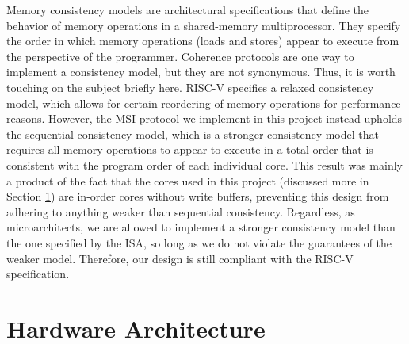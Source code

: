 \documentclass[10pt, compsoc]{IEEEtran}
\begin{document}
Memory consistency models are architectural specifications that define the behavior of memory operations in a shared-memory multiprocessor. They specify the order in which memory operations (loads and stores) appear to execute from the perspective of the programmer. Coherence protocols are one way to implement a consistency model, but they are not synonymous. Thus, it is worth touching on the subject briefly here. RISC-V specifies a relaxed consistency model, which allows for certain reordering of memory operations for performance reasons. However, the MSI protocol we implement in this project instead upholds the sequential consistency model, which is a stronger consistency model that requires all memory operations to appear to execute in a total order that is consistent with the program order of each individual core. This result was mainly a product of the fact that the cores used in this project (discussed more in Section \ref{sec:Hardware}) are in-order cores without write buffers, preventing this design from adhering to anything weaker than sequential consistency. Regardless, as microarchitects, we are allowed to implement a stronger consistency model than the one specified by the ISA, so long as we do not violate the guarantees of the weaker model. Therefore, our design is still compliant with the RISC-V specification.



\section{Hardware Architecture}\label{sec:Hardware}
\end{document}

